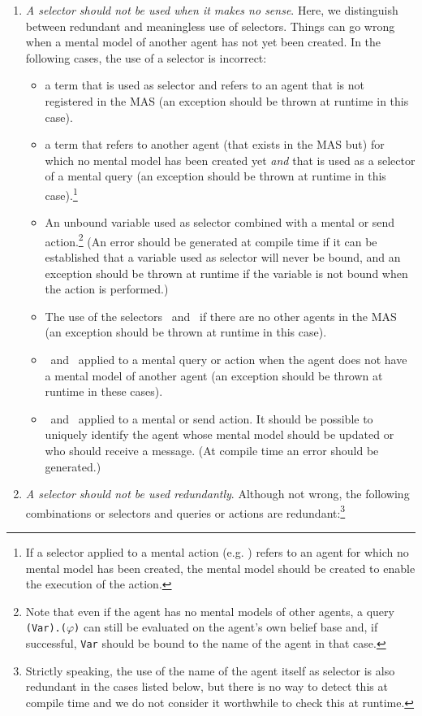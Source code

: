 \documentclass{article}
\begin{document}
\begin{enumerate}
\item \textit{A selector should not be used when it makes no sense}. Here, we distinguish between redundant and meaningless use of selectors. Things can go wrong when a mental model of another agent has not yet been created. In the following cases, the use of a selector is incorrect:
	\begin{itemize}
	\item a term that is used as selector and refers to an agent that is not registered in the MAS (an exception should be thrown at runtime in this case).
	\item a term that refers to another agent (that exists in the MAS but) for which no mental model has been created yet \textit{and} that is used as a selector of a mental query (an exception should be thrown at runtime in this case).\footnote{If a selector applied to a mental action (e.g. \insertp) refers to an agent for which no mental model has been created, the mental model should be created to enable the execution of the action.}
	\item An unbound variable used as selector combined with a mental or send action.\footnote{Note that even if the agent has no mental models of other agents, a query \texttt{(Var).\belp($\varphi$)} can still be evaluated on the agent's own belief base and, if successful, \texttt{Var} should be bound to the name of the agent in that case.} (An error should be generated at compile time if it can be established that a variable used as selector will never be bound, and an exception should be thrown at runtime if the variable is not bound when the action is performed.)
	\item The use of the selectors \allother\, and \someother\, if there are no other agents in the MAS (an exception should be thrown at runtime in this case).
	\item \allother\, and \someother\, applied to a mental query or action when the agent does not have a mental model of another agent (an exception should be thrown at runtime in these cases).
	\item \somep\, and \someother\, applied to a mental or send action. It should be possible to uniquely identify the agent whose mental model should be updated or who should receive a message. (At compile time an error should be generated.)
	\end{itemize}
\item \textit{A selector should not be used redundantly}. Although not wrong, the following combinations or selectors and queries or actions are redundant:\footnote{Strictly speaking, the use of the name of the agent itself as selector is also redundant in the cases listed below, but there is no way to detect this at compile time and we do not consider it worthwhile to check this at runtime.}

\end{enumerate}
\end{document}
